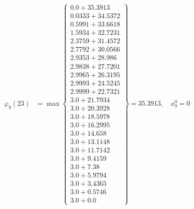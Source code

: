 \documentclass{article}
\begin{document}
\begin{align*}
  
  
  
\varphi_{9}(23) &= \max \left\{ \begin{array}{c}
0.0 + 35.3913 \\
 0.0333 + 34.5372 \\
 0.5991 + 33.6618 \\
 1.5934 + 32.7231 \\
 2.3759 + 31.4572 \\
 2.7792 + 30.0566 \\
 2.9353 + 28.986 \\
 2.9838 + 27.7201 \\
 2.9965 + 26.3195 \\
 2.9993 + 24.5245 \\
 2.9999 + 22.7321 \\
 3.0 + 21.7934 \\
 3.0 + 20.3928 \\
 3.0 + 18.5978 \\
 3.0 + 16.2995 \\
 3.0 + 14.658 \\
 3.0 + 13.1148 \\
 3.0 + 11.7142 \\
 3.0 + 9.4159 \\
 3.0 + 7.38 \\
 3.0 + 5.9794 \\
 3.0 + 3.4365 \\
 3.0 + 0.5746 \\
 3.0 + 0.0
\end{array} \right\}=35.3913,\quad x_{9}^0=0\\
  
  
  

\end{align*}
\end{document}

